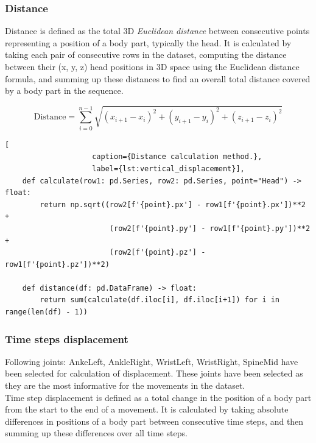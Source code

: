             \subsubsection{Distance}

                Distance is defined as the total 3D \textit{Euclidean distance} between consecutive points representing a position of a body part, typically the head. It is calculated by taking each pair of consecutive rows in the dataset, computing the distance between their (x, y, z) head positions in 3D space using the Euclidean distance formula, and summing up these distances to find an overall total distance covered by a body part in the sequence.

                \begin{equation}
                    \text{Distance} = \sum_{i=0}^{n-1} \sqrt{(x_{i+1} - x_i)^2 + (y_{i+1} - y_i)^2 + (z_{i+1} - z_i)^2}
                \end{equation}

                \begin{lstlisting}[
                    caption={Distance calculation method.}, 
                    label={lst:vertical_displacement}],     
    def calculate(row1: pd.Series, row2: pd.Series, point="Head") -> float:
        return np.sqrt((row2[f'{point}.px'] - row1[f'{point}.px'])**2 +
                        (row2[f'{point}.py'] - row1[f'{point}.py'])**2 +
                        (row2[f'{point}.pz'] - row1[f'{point}.pz'])**2)
    
    def distance(df: pd.DataFrame) -> float:
        return sum(calculate(df.iloc[i], df.iloc[i+1]) for i in range(len(df) - 1))
                \end{lstlisting}
            \subsubsection{Time steps displacement}
                Following joints: AnkeLeft, AnkleRight, WristLeft, WristRight, SpineMid have been selected for calculation of displacement. These joints have been selected as they are the most informative for the movements in the dataset. \\

                Time step displacement is defined as a total change in the position of a body part from the start to the end of a movement. It is calculated by taking absolute differences in positions of a body part between consecutive time steps, and then summing up these differences over all time steps.

